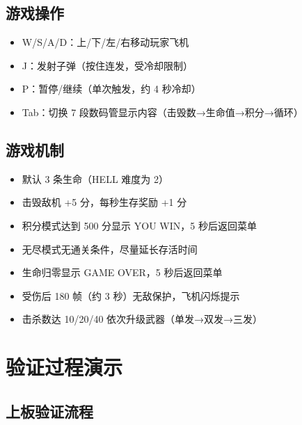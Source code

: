 \documentclass[12pt,a4paper]{ctexart}
\begin{document}
\subsection{游戏操作}
\begin{itemize}
    \item W/S/A/D：上/下/左/右移动玩家飞机
    \item J：发射子弹（按住连发，受冷却限制）
    \item P：暂停/继续（单次触发，约 4 秒冷却）
    \item Tab：切换 7 段数码管显示内容（击毁数→生命值→积分→循环）
\end{itemize}

\subsection{游戏机制}
\begin{itemize}
    \item 默认 3 条生命（HELL 难度为 2）
    \item 击毁敌机 +5 分，每秒生存奖励 +1 分
    \item 积分模式达到 500 分显示 YOU WIN，5 秒后返回菜单
    \item 无尽模式无通关条件，尽量延长存活时间
    \item 生命归零显示 GAME OVER，5 秒后返回菜单
    \item 受伤后 180 帧（约 3 秒）无敌保护，飞机闪烁提示
    \item 击杀数达 10/20/40 依次升级武器（单发→双发→三发）
\end{itemize}


\section{验证过程演示}

\subsection{上板验证流程}
\end{document}
